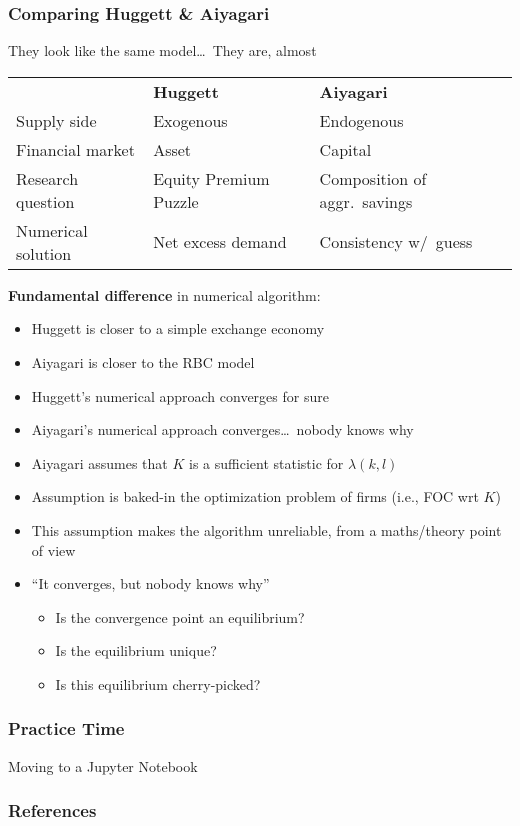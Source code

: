 \documentclass[10pt, aspectratio=1610, natbib, handout]{beamer}
\begin{document}
  \begin{frame}
    \frametitle{Comparing Huggett \& Aiyagari}

    They look like the same model\dots\ They are, almost

    \vfill\pause

    \begin{table}
      \centering
      \begin{tabular}{lll}
        \toprule
        & \textbf{Huggett} & \textbf{Aiyagari} \\
        \cmidrule{2-3}
        Supply side & Exogenous & Endogenous \\
        Financial market & Asset & Capital \\
        Research question & Equity Premium Puzzle & Composition of aggr.~savings \\
        Numerical solution & Net excess demand & Consistency w/~guess \\
        \bottomrule
      \end{tabular}
    \end{table}

    \vfill\pause

    \textbf{Fundamental difference} in numerical algorithm:
    \begin{itemize}
      \item Huggett is closer to a simple exchange economy
      \item Aiyagari is closer to the RBC model
      \item Huggett's numerical approach converges for sure
      \item Aiyagari's numerical approach converges\dots\ nobody knows why
      \item Aiyagari assumes that $K$ is a sufficient statistic for $\lambda(k, l)$
      \item Assumption is baked-in the optimization problem of firms (i.e., FOC wrt $K$)
      \item This assumption makes the algorithm unreliable, from a maths/theory point of view
      \item ``It converges, but nobody knows why''
        \begin{itemize}
          \item Is the convergence point an equilibrium?
          \item Is the equilibrium unique?
          \item Is this equilibrium cherry-picked?
        \end{itemize}
    \end{itemize}

  \end{frame}

  \begin{frame}
    \frametitle{Practice Time}

    Moving to a Jupyter Notebook

  \end{frame}

  \appendix


  \begin{frame}
    \frametitle{References}

    
    

  \end{frame}
\end{document}
